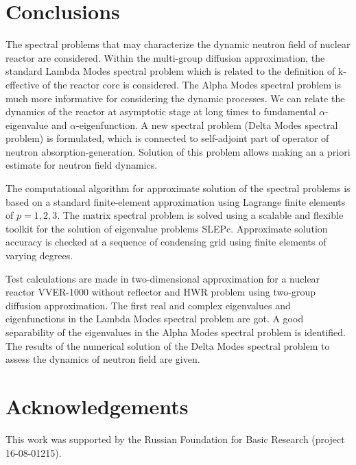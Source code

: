 \documentclass[authoryear]{elsarticle}
\begin{document}
\pagebreak
\section{Conclusions} 

The spectral problems that may characterize the dynamic neutron field of nuclear reactor are considered. Within the multi-group diffusion approximation, the standard Lambda Modes spectral problem which is related to the definition of k-effective of the reactor core is considered. The Alpha Modes spectral problem is much more informative for considering the dynamic processes. We can relate the dynamics of the reactor at asymptotic stage at long times to fundamental $\alpha$-eigenvalue and  $\alpha$-eigenfunction. A new spectral problem (Delta Modes spectral problem) is formulated, which is connected to self-adjoint part of operator of neutron absorption-generation. Solution of this problem allows making an a priori estimate for neutron field dynamics.

The computational algorithm for approximate solution of the spectral problems is based on a standard finite-element approximation using Lagrange finite elements of  $p=1,2,3$. 
The matrix spectral problem is solved using a scalable and flexible toolkit for the solution of eigenvalue problems SLEPc. Approximate solution accuracy is checked at a sequence of condensing grid using finite elements of varying degrees.

Test calculations are made in two-dimensional approximation for a nuclear reactor VVER-1000 without reflector and HWR problem using two-group diffusion approximation. The first real and complex eigenvalues and eigenfunctions in the Lambda Modes spectral problem are got. A good separability of the eigenvalues in the Alpha Modes spectral problem is identified. The results of the numerical solution of the Delta Modes spectral problem to assess the dynamics of neutron field are given.

\section*{Acknowledgements}

This work was supported by the Russian Foundation for Basic Research (project 16-08-01215).



\end{document}
